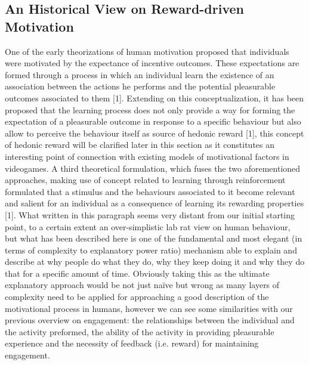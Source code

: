 \subsection{An Historical View on Reward-driven Motivation}
\label{motivation_hist}
One of the early theorizations of human motivation proposed that individuals were motivated by the expectance of incentive outcomes. These expectations are formed through a process in which an individual learn the existence of an association between the actions he performs and the potential pleasurable outcomes associated to them [1]. Extending on this conceptualization, it has been proposed that the learning process does not only provide a way for forming the expectation of a pleasurable outcome in response to a specific behaviour but also allow to perceive the behaviour itself as source of hedonic reward [1], this concept of hedonic reward will be clarified later in this section as it constitutes an interesting point of connection with existing models of motivational factors in videogames. A third theoretical formulation, which fuses the two aforementioned approaches, making use of  concept related to learning through reinforcement formulated that a stimulus and the behaviours associated to it become relevant and salient for an individual as a consequence of learning its rewarding properties [1]. What written in this paragraph seems very distant from our initial starting point, to a certain extent an over-simplistic lab rat view on human behaviour, but what has been described here is one of the fundamental and most elegant (in terms of complexity to explanatory power ratio) mechanism able to explain and describe at why people do what they do, why they keep doing it and why they do that for a specific amount of time. Obviously taking this as the ultimate explanatory approach would be not just naïve but wrong as many layers of complexity need to be applied for approaching a good description of the motivational process in humans, however we can see some similarities with our previous overview on engagement: the relationships between the individual and the activity preformed, the ability of the activity in providing pleasurable experience and the necessity of feedback (i.e. reward) for maintaining engagement.

